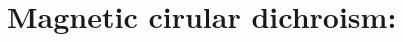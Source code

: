 
\section{Magnetic cirular dichroism: }\label{sec:ccmcd}

\begin{description}
\item[] 
%
\item[] 
%
\item[] 
%
\item[] 
%
\end{description}
